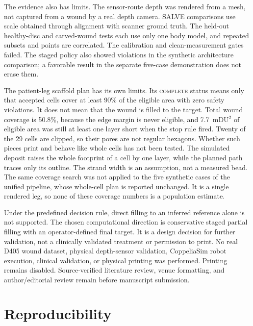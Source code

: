 \documentclass[conference]{IEEEtran}
\begin{document}
The evidence also has limits. The sensor-route depth was rendered from a
mesh, not captured from a wound by a real depth camera. SALVE comparisons
use scale obtained through alignment with scanner ground truth. The
held-out healthy-disc and carved-wound tests each use only one body model,
and repeated subsets and points are correlated. The calibration and
clean-measurement gates failed. The staged policy also showed violations in
the synthetic architecture comparison; a favorable result in the separate
five-case demonstration does not erase them.

The patient-leg scaffold plan has its own limits. Its \textsc{complete}
status means only that accepted cells cover at least 90\% of the eligible
area with zero safety violations. It does not mean that the wound is filled
to the target. Total wound coverage is 50.8\%, because the edge margin is
never eligible, and 7.7~mDU$^2$ of eligible area was still at least one
layer short when the stop rule fired. Twenty of the 29 cells are clipped,
so their pores are not regular hexagons. Whether such pieces print and
behave like whole cells has not been tested. The simulated deposit raises
the whole footprint of a cell by one layer, while the planned path traces
only its outline. The strand width is an assumption, not a measured bead.
The same coverage search was not applied to the five synthetic cases of the
unified pipeline, whose whole-cell plan is reported unchanged. It is a
single rendered leg, so none of these coverage numbers is a population
estimate.

Under the predefined decision rule, direct filling to an inferred reference
alone is not supported. The chosen computational direction is conservative
staged partial filling with an operator-defined final target. It is a design
decision for further validation, not a clinically validated treatment or
permission to print. No real D405 wound dataset, physical depth-sensor
validation, CoppeliaSim robot execution, clinical validation, or physical
printing was performed. Printing remains disabled. Source-verified
literature review, venue formatting, and author/editorial review remain
before manuscript submission.

\section*{Reproducibility}
\end{document}
